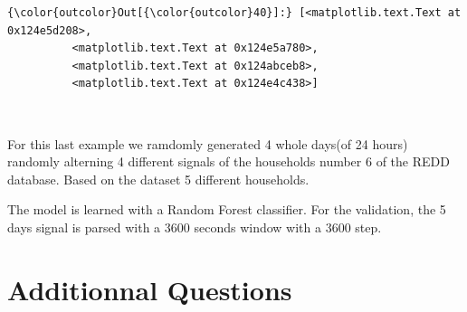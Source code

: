 \documentclass{article}
\begin{document}
            \begin{Verbatim}[commandchars=\\\{\}]
{\color{outcolor}Out[{\color{outcolor}40}]:} [<matplotlib.text.Text at 0x124e5d208>,
          <matplotlib.text.Text at 0x124e5a780>,
          <matplotlib.text.Text at 0x124abceb8>,
          <matplotlib.text.Text at 0x124e4c438>]
\end{Verbatim}
        
    \begin{center}
    \end{center}
    { \hspace*{\fill} \\}
    
    For this last example we ramdomly generated 4 whole days(of 24 hours)
randomly alterning 4 different signals of the households number 6 of the
REDD database. Based on the dataset 5 different households.

The model is learned with a Random Forest classifier. For the
validation, the 5 days signal is parsed with a 3600 seconds window with
a 3600 step.

    \section{Additionnal Questions}\label{additionnal-questions}
\end{document}
